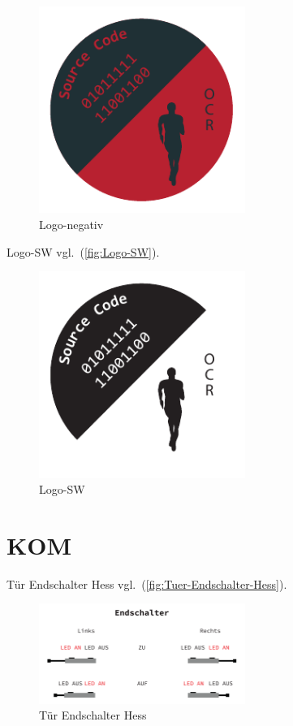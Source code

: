 \begin{figure}[!hb]%
\centering
\includegraphics[width=0.6\textwidth]{Grafiken/Logo-negativ.pdf}
\caption{Logo-negativ}
\label{fig:Logo-negativ}%
\end{figure}

Logo-SW vgl.~(\autoref{fig:Logo-SW}).

\begin{figure}[!hb]%
\centering
\includegraphics[width=0.6\textwidth]{Grafiken/Logo-SW.pdf}
\caption{Logo-SW}
\label{fig:Logo-SW}%
\end{figure}


\section{KOM}\label{kom}

Tür Endschalter Hess vgl.~(\autoref{fig:Tuer-Endschalter-Hess}).

\begin{figure}[!hb]%
\centering
\includegraphics[width=0.6\textwidth]{Grafiken/Tuer-Endschalter-Hess.pdf}
\caption{Tür Endschalter Hess}
\label{fig:Tuer-Endschalter-Hess}%
\end{figure}

